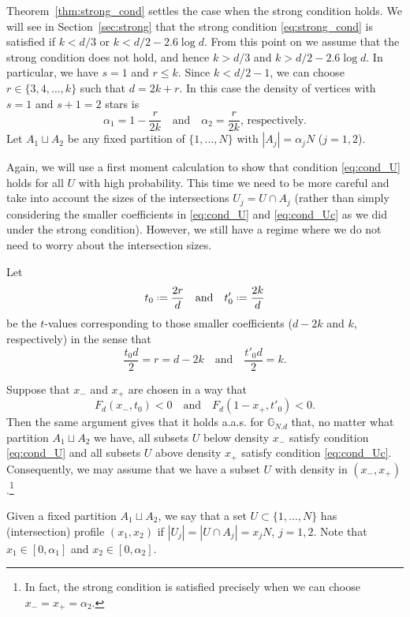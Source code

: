 \documentclass[12pt]{amsart}
\theoremstyle{definition}
\newcommand\Gb{\mathbb{G}}
\newcommand\al{\alpha}
\newcommand\be{\beta}
\newcommand{\defeq}{\mathrel{\vcenter{\baselineskip0.5ex \lineskiplimit0pt
                     \hbox{\scriptsize.}\hbox{\scriptsize.}}}%
                     =}
\begin{document}
Theorem~\ref{thm:strong_cond} settles the case when the strong condition holds. We will see in Section~\ref{sec:strong} that the strong condition \eqref{eq:strong_cond} is satisfied if $k<d/3$ or $k<d/2-2.6 \log d$. From this point on we assume that the strong condition does not hold, and hence $k > d/3$ and $k>d/2-2.6 \log d$. In particular, we have $s=1$ and $r \leq k$. Since $k < d/2-1$, we can choose $r \in \{3,4,\ldots,k\}$ such that $d=2k+r$. In this case the density of vertices with $s=1$ and $s+1=2$ stars is 
%
\[ \al_1 = 1-\frac{r}{2k} %
\quad \text{and} \quad 
\al_2 = \frac{r}{2k} %
\text{, respectively.} \]
%
Let $A_1 \sqcup A_2$ be any fixed partition of $\{1,\ldots,N\}$ with $|A_j|=\al_j N$ ($j=1,2$). 

Again, we will use a first moment calculation to show that condition \eqref{eq:cond_U} holds for all $U$ with high probability. This time we need to be more careful and take into account the sizes of the intersections $U_j=U \cap A_j$ (rather than simply considering the smaller coefficients in \eqref{eq:cond_U} and \eqref{eq:cond_Uc} as we did under the strong condition). However, we still have a regime where we do not need to worry about the intersection sizes.

Let 
%
\[ t_0 \defeq \frac{2r}{d} %
\quad \text{and} \quad
t'_0 \defeq \frac{2k}{d} \]
%
be the $t$-values corresponding to those smaller coefficients ($d-2k$ and $k$, respectively) in the sense that 
%
\[ \frac{t_0 d}{2} = r= d-2k 
\quad \text{and} \quad
\frac{t'_0 d}{2} = k .\]
%


Suppose that $x_-$ and $x_+$ are chosen in a way that 
%
\begin{equation} \label{eq:x_minus_plus}
F_d(x_-,t_0) < 0 
\quad \text{and} \quad 
F_d(1-x_+,t'_0) < 0 .
\end{equation}
%
Then the same argument gives that it holds a.a.s. for $\Gb_{N.d}$ that, no matter what partition $A_1 \sqcup A_2$ we have, all subsets $U$ below density $x_-$ satisfy condition \eqref{eq:cond_U} and all subsets $U$ above density $x_+$ satisfy condition \eqref{eq:cond_Uc}. Consequently, we may assume that we have a subset $U$ with density in $(x_-,x_+)$.\footnote{In fact, the strong condition is satisfied precisely when we can choose $x_-=x_+=\al_2$.} 

Given a fixed partition $A_1 \sqcup A_2$, we say that a set $U \subset \{1,\ldots,N\}$ has (intersection) profile $(x_1,x_2)$ if $|U_j|=|U \cap A_j|=x_j N$, $j=1,2$. Note that $x_1 \in [0,\al_1]$ and $x_2 \in [0,\al_2]$. 
\end{document}
